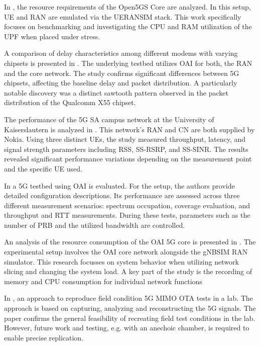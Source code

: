 In \cite{mamushiane2023towards}, the resource requirements of the Open5GS Core are analyzed.
In this setup, \gls{UE} and \gls{RAN} are emulated via the UERANSIM stack.
This work specifically focuses on benchmarking and investigating the CPU and RAM utilization of the \gls{UPF} when placed under stress.

A comparison of delay characteristics among different modems with varying chipsets is presented in \cite{seidel2024impact}.
The underlying testbed utilizes OAI for both, the \gls{RAN} and the core network.
The study confirms significant differences between 5G chipsets, affecting the baseline delay and packet distribution.
A particularly notable discovery was a distinct sawtooth pattern observed in the packet distribution of the Qualcomm X55 chipset.

The performance of the 5G SA campus network at the University of Kaiserslautern is analyzed in \cite{mallikarjun2022performance}.
This network's RAN and CN are both supplied by Nokia.
Using three distinct UEs, the study measured throughput, latency, and signal strength parameters including RSS, SS-RSRP, and SS-SINR.
The results revealed significant performance variations depending on the measurement point and the specific UE used.

In \cite{doria2024virtualized} a 5G testbed using OAI is evaluated.
For the setup, the authors provide detailed configuration descriptions.
Its performance are assessed across three different measurement scenarios: spectrum occupation,
coverage evaluation, and throughput and RTT measurements.
During these tests, parameters such as the number of \gls{PRB} and the utilized bandwidth are controlled.

An analysis of the resource consumption of the OAI 5G core is presented in \cite{atalay2022scaling}.
The experimental setup involves the OAI core network alongside the gNBSIM RAN simulator.
This research focusses on system behavior when utilizing network slicing and changing the system load.
A key part of the study is the recording of memory and CPU consumption for individual network functions

In \cite{kim2024toward}, an approach to reproduce field condition 5G MIMO OTA tests in a lab.
The approach is based on capturing, analyzing and reconstructing the 5G signals.
The paper confirms the general feasibility of recreating field test conditions in the lab.
However, future work and testing, e.g. with an anechoic chamber, is required to enable precise replication.


